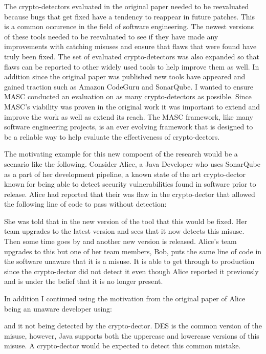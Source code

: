 The crypto-detectors evaluated in the original paper needed to be reevaluated because bugs that get fixed have a tendency to reappear in future patches. This is a common occurence in the field of software engineering. The newest versions of these tools needed to be reevaluated to see if they have made any improvements with catching misuses and ensure that flaws that were found have truly been fixed. The set of evaluated crypto-detectors was also expanded so that flaws can be reported to other widely used tools to help improve them as well. In addition since the original paper was published new tools have appeared and gained traction such as Amazon CodeGuru and SonarQube. I wanted to ensure MASC conducted an evaluation on as many crypto-detectors as possible. Since MASC's viability was proven in the original work it was important to extend and improve the work as well as extend its reach. The MASC framework, like many software engineering projects, is an ever evolving framework that is designed to be a reliable way to help evaluate the effectiveness of crypto-dectors.

The motivating example for this new compoent of the research would be a scenario like the following. Consider Alice, a Java Developer who uses SonarQube as a part of her development pipeline, a known state of the art crypto-dector known for being able to detect security vulnerabilities found in software prior to release. Alice had reported that their was flaw in the crypto-dector that allowed the following line of code to pass without detection:


She was told that in the new version of the tool that this would be fixed. Her team upgrades to the latest version and sees that it now detects this misuse. Then some time goes by and another new version is released. Alice's team upgrades to this but one of her team members, Bob, puts the same line of code in the software unaware that it is a misuse. It is able to get through to production since the crypto-dector did not detect it even though Alice reported it previously and is under the belief that it is no longer present.

In addition I continued using the motivation from the original paper of Alice being an unaware developer using:


and it not being detected by the crypto-dector. DES is the common version of the misuse, however, Java supports both the uppercase and lowercase versions of this misuse. A crypto-dector would be expected to detect this common mistake.

